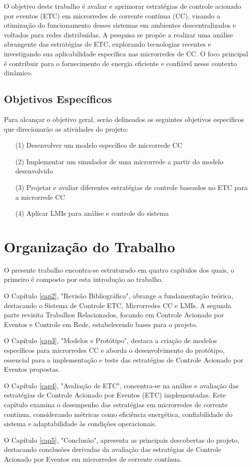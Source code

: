 O objetivo deste trabalho é avaliar e aprimorar estratégias de controle acionado por eventos (ETC) em microrredes de corrente contínua (CC), visando a otimização do funcionamento desses sistemas em ambientes descentralizados e voltados para redes distribuídas. A pesquisa se propõe a realizar uma análise abrangente das estratégias de ETC, explorando tecnologias recentes e investigando sua aplicabilidade específica nas microrredes de CC. O foco principal é contribuir para o fornecimento de energia eficiente e confiável nesse contexto dinâmico.

\subsection{Objetivos Específicos}
Para alcançar o objetivo geral, serão delineados os seguintes objetivos específicos que direcionarão as atividades do projeto:

\begin{enumerate}
	\item[(1)] Desenvolver um modelo específico de microrrede CC
	\item[(2)] Implementar um simulador de uma microrrede a partir do modelo desenvolvido
	\item[(3)] Projetar e avaliar diferentes estratégias de controle baseados no ETC para a microrrede CC
	\item[(4)] Aplicar LMIs para análise e controle do sistema
\end{enumerate}

\section{Organização do Trabalho}

O presente trabalho encontra-se estruturado em quatro capítulos dos quais, o primeiro é composto por esta introdução ao trabalho.

O Capítulo \ref{cap2}, "Revisão Bibliográfica", abrange a fundamentação teórica, destacando o Sistema de Controle ETC, Microrredes CC e LMIs. A segunda parte revisita Trabalhos Relacionados, focando em Controle Acionado por Eventos e Controle em Rede, estabelecendo bases para o projeto.

O Capítulo \ref{cap3}, "Modelos e Protótipo", destaca a criação de modelos específicos para microrredes CC e aborda o desenvolvimento do protótipo, essencial para a implementação e teste das estratégias de Controle Acionado por Eventos propostas.

O Capítulo \ref{cap4}, "Avaliação de ETC", concentra-se na análise e avaliação das estratégias de Controle Acionado por Eventos (ETC) implementadas. Este capítulo examina o desempenho das estratégias em microrredes de corrente contínua, considerando métricas como eficiência energética, confiabilidade do sistema e adaptabilidade às condições operacionais.

O Capítulo \ref{cap5}, "Conclusão", apresenta as principais descobertas do projeto, destacando conclusões derivadas da avaliação das estratégias de Controle Acionado por Eventos em microrredes de corrente contínua.

